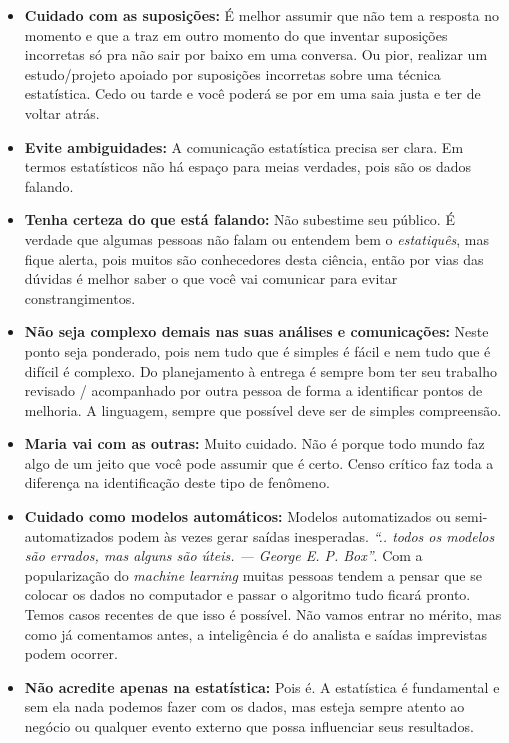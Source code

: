\documentclass[12pt,]{style/krantz}
\theoremstyle{definition}
\theoremstyle{definition}
\theoremstyle{definition}
\theoremstyle{remark}
\begin{document}
\begin{itemize}
\item
  \textbf{Cuidado com as suposições:} É melhor assumir que não tem a resposta no momento e que a traz em outro momento do que inventar suposições incorretas só pra não sair por baixo em uma conversa. Ou pior, realizar um estudo/projeto apoiado por suposições incorretas sobre uma técnica estatística. Cedo ou tarde e você poderá se por em uma saia justa e ter de voltar atrás.
\item
  \textbf{Evite ambiguidades:} A comunicação estatística precisa ser clara. Em termos estatísticos não há espaço para meias verdades, pois são os dados falando.
\item
  \textbf{Tenha certeza do que está falando:} Não subestime seu público. É verdade que algumas pessoas não falam ou entendem bem o \emph{estatiquês}, mas fique alerta, pois muitos são conhecedores desta ciência, então por vias das dúvidas é melhor saber o que você vai comunicar para evitar constrangimentos.
\item
  \textbf{Não seja complexo demais nas suas análises e comunicações:} Neste ponto seja ponderado, pois nem tudo que é simples é fácil e nem tudo que é difícil é complexo. Do planejamento à entrega é sempre bom ter seu trabalho revisado / acompanhado por outra pessoa de forma a identificar pontos de melhoria. A linguagem, sempre que possível deve ser de simples compreensão.
\item
  \textbf{Maria vai com as outras:} Muito cuidado. Não é porque todo mundo faz algo de um jeito que você pode assumir que é certo. Censo crítico faz toda a diferença na identificação deste tipo de fenômeno.
\item
  \textbf{Cuidado como modelos automáticos:} Modelos automatizados ou semi-automatizados podem às vezes gerar saídas inesperadas. \emph{``.. todos os modelos são errados, mas alguns são úteis. --- George E. P. Box''}. Com a popularização do \emph{machine learning}
  muitas pessoas tendem a pensar que se colocar os dados no computador e passar o algoritmo tudo ficará pronto. Temos casos recentes de que isso é possível. Não vamos entrar no mérito, mas como já comentamos antes, a inteligência é do analista e saídas imprevistas podem ocorrer.
\item
  \textbf{Não acredite apenas na estatística:} Pois é. A estatística é fundamental e sem ela nada podemos fazer com os dados, mas esteja sempre atento ao negócio ou qualquer evento externo que possa influenciar seus resultados.
\end{itemize}
\end{document}
